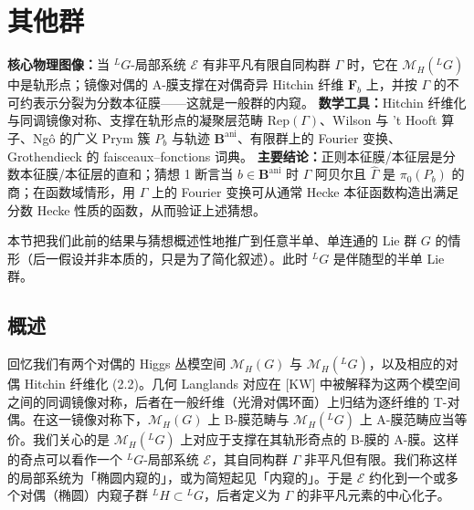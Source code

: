 

\section{其他群}

\begin{keytakeaway}
\textbf{核心物理图像：}当 ${}^{L}G$-局部系统 $\mathcal{E}$ 有非平凡有限自同构群 $\Gamma$ 时，它在 $\mathcal{M}_H({}^{L}G)$ 中是轨形点；镜像对偶的 A-膜支撑在对偶奇异 Hitchin 纤维 $\boldsymbol{F}_b$ 上，并按 $\Gamma$ 的不可约表示分裂为分数本征膜——这就是一般群的内窥。
\textbf{数学工具：}Hitchin 纤维化与同调镜像对称、支撑在轨形点的凝聚层范畴 $\mathrm{Rep}(\Gamma)$、Wilson 与 't Hooft 算子、Ngô 的广义 Prym 簇 $P_b$ 与轨迹 $\boldsymbol{B}^{\mathrm{ani}}$、有限群上的 Fourier 变换、Grothendieck 的 faisceaux--fonctions 词典。
\textbf{主要结论：}正则本征膜/本征层是分数本征膜/本征层的直和；猜想 1 断言当 $b\in\boldsymbol{B}^{\mathrm{ani}}$ 时 $\Gamma$ 阿贝尔且 $\widehat{\Gamma}$ 是 $\pi_0(P_b)$ 的商；在函数域情形，用 $\Gamma$ 上的 Fourier 变换可从通常 Hecke 本征函数构造出满足分数 Hecke 性质的函数，从而验证上述猜想。
\end{keytakeaway}

本节把我们此前的结果与猜想概述性地推广到任意半单、单连通的 Lie 群 $G$ 的情形（后一假设并非本质的，只是为了简化叙述）。此时 ${}^{L}G$ 是伴随型的半单 Lie 群。

\subsection{概述}

回忆我们有两个对偶的 Higgs 丛模空间 $\mathcal{M}_H(G)$ 与 $\mathcal{M}_H({}^{L}G)$，以及相应的对偶 Hitchin 纤维化 (2.2)。几何 Langlands 对应在 [KW] 中被解释为这两个模空间之间的同调镜像对称，后者在一般纤维（光滑对偶环面）上归结为逐纤维的 T-对偶。在这一镜像对称下，$\mathcal{M}_H(G)$ 上 B-膜范畴与 $\mathcal{M}_H({}^{L}G)$ 上 A-膜范畴应当等价。我们关心的是 $\mathcal{M}_H({}^{L}G)$ 上对应于支撑在其轨形奇点的 B-膜的 A-膜。这样的奇点可以看作一个 ${}^{L}G$-局部系统 $\mathcal{E}$，其自同构群 $\Gamma$ 非平凡但有限。我们称这样的局部系统为「椭圆内窥的」，或为简短起见「内窥的」。于是 $\mathcal{E}$ 约化到一个或多个对偶（椭圆）内窥子群 ${}^{L}H\subset{}^{L}G$，后者定义为 $\Gamma$ 的非平凡元素的中心化子。

